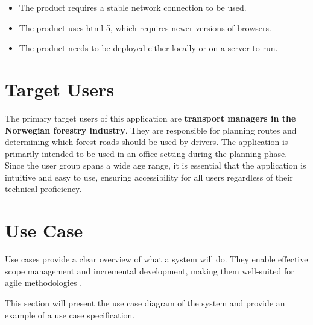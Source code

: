\begin{itemize}
    \item The product requires a stable network connection to be used.
    \item The product uses \acrshort{html} 5, which requires newer versions of browsers.
    \item The product needs to be deployed either locally or on a server to run.
\end{itemize}

\section{Target Users}

The primary target users of this application are \textbf{transport managers in the Norwegian forestry industry}. They are responsible for planning routes and determining which forest roads should be used by drivers. The application is primarily intended to be used in an office setting during the planning phase. Since the user group spans a wide age range, it is essential that the application is intuitive and easy to use, ensuring accessibility for all users regardless of their technical proficiency.


\section{Use Case}

Use cases provide a clear overview of what a system will do. They enable effective scope management and incremental development, making them well-suited for agile methodologies \cite{jacobson_use_case}. 

This section will present the use case diagram of the system and provide an example of a use case specification.

